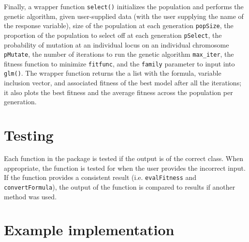 \documentclass{article}\usepackage[]{graphicx}\usepackage[]{color}
\begin{document}
Finally, a wrapper function \texttt{select()} initializes the population and performs the genetic algorithm, given user-supplied data (with the user supplying the name of the response variable), size of the population at each generation \texttt{popSize}, the proportion of the population to select off at each generation \texttt{pSelect}, the probability of mutation at an individual locus on an individual chromosome \texttt{pMutate}, the number of iterations to run the genetic algorithm \texttt{max\_iter}, the fitness function to minimize \texttt{fitfunc}, and the \texttt{family} parameter to input into \texttt{glm()}. The wrapper function returns the a list with the formula, variable inclusion vector, and associated fitness of the best model after all the iterations; it also plots the best fitness and the average fitness across the population per generation.

\section{Testing}

Each function in the package is tested if the output is of the correct class. When appropriate, the function is tested for when the user provides the incorrect input. If the function provides a consistent result (i.e. \texttt{evalFitness} and \texttt{convertFormula}), the output of the function is compared to results if another method was used.

\section{Example implementation}
\end{document}
